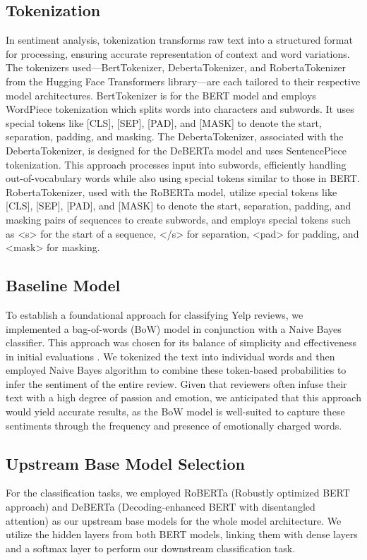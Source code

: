 \documentclass[11pt]{article}
\begin{document}
\subsection{Tokenization}
In sentiment analysis, tokenization transforms raw text into a structured format for processing, ensuring accurate representation of context and word variations. The tokenizers used—BertTokenizer, DebertaTokenizer, and RobertaTokenizer from the Hugging Face Transformers library—are each tailored to their respective model architectures. BertTokenizer is for the BERT model and employs WordPiece tokenization which splits words into characters and subwords. It uses special tokens like [CLS], [SEP], [PAD], and [MASK] to denote the start, separation, padding, and masking. The DebertaTokenizer, associated with the DebertaTokenizer, is designed for the DeBERTa model and uses SentencePiece tokenization. This approach processes input into subwords, efficiently handling out-of-vocabulary words while also using special tokens similar to those in BERT. RobertaTokenizer, used with the RoBERTa model, utilize special tokens like [CLS], [SEP], [PAD], and [MASK] to denote the start, separation, padding, and masking pairs of sequences to create subwords, and employs special tokens such as <s> for the start of a sequence, </s> for separation, <pad> for padding, and <mask> for masking. 

\subsection{Baseline Model}
To establish a foundational approach for classifying Yelp reviews, we implemented a bag-of-words (BoW) model in conjunction with a Naive Bayes classifier. This approach was chosen for its balance of simplicity and effectiveness in initial evaluations \citep{rish2001empirical}. We tokenized the text into individual words and then employed Naive Bayes algorithm to combine these token-based probabilities to infer the sentiment of the entire review. Given that reviewers often infuse their text with a high degree of passion and emotion, we anticipated that this approach would yield accurate results, as the BoW model is well-suited to capture these sentiments through the frequency and presence of emotionally charged words.

\subsection{Upstream Base Model Selection}
For the classification tasks, we employed RoBERTa (Robustly optimized BERT approach) and DeBERTa (Decoding-enhanced BERT with disentangled attention) as our upstream base models for the whole model architecture. We utilize the hidden layers from both BERT models, linking them with dense layers and a softmax layer to perform our downstream classification task. 
\end{document}
